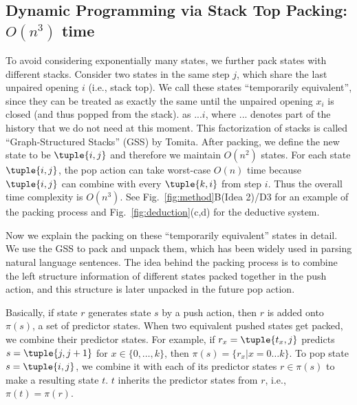 \subsection*{Dynamic Programming via Stack Top Packing: $O(n^3)$ time}

To avoid considering exponentially many states, 
we further
pack states with different stacks.
Consider two states in the same step $j$,
which share the last unpaired opening $i$ (i.e., stack top). 
We call these states ``temporarily equivalent'', since they can be treated as
exactly the same until the unpaired opening $x_i$ is closed (and thus popped from the stack).
as $...i$, where $...$ denotes part of the history that we do not need at this moment.
This factorization of stacks is called ``Graph-Structured Stacks'' (GSS) by Tomita. \cite{Tomita:1988}
After packing, we define the new state to be $\tuple{i,j}$
and therefore we  maintain $O(n^2)$ states.
For each state $\tuple{i,j}$, the pop action
can take worst-case $O(n)$ time because $\tuple{i,j}$ can combine with every $\tuple{k,i}$ from step $i$.
Thus the overall time complexity is $O(n^3)$.
See Fig.~\ref{fig:method}B(Idea 2)/D3 for  
an example of the packing process
and Fig.~\ref{fig:deduction}(c,d)
for the deductive system.

Now we explain the
packing on these ``temporarily equivalent'' states in detail. 
We use the GSS \cite{Tomita:1988} to pack and unpack
them, which has been widely used in parsing natural language sentences.
\cite{huang+sagae:2010}
The idea behind the packing process is to combine the left structure information
of different states packed together in the push action,
and this structure is later unpacked in the future pop action.

Basically, if state $r$ generates state $s$ by a push action, then $r$ is added
onto $\pi(s)$, a set of predictor states. When two equivalent pushed states get
packed, we combine their predictor states. For example, if $r_x =
\tuple{t_x, j}$ predicts $s = \tuple{j,j+1}$ for $x\in \{0,\ldots, k\}$, then $\pi(s) =
\{r_x|x=0 \ldots k\}$. 
To pop state $s = \tuple{i,j}$, we combine it with each of its predictor states
$r \in \pi(s)$ to make a resulting state $t$.
$t$ inherits the predictor states from $r$, i.e., $\pi(t) = \pi(r)$.

